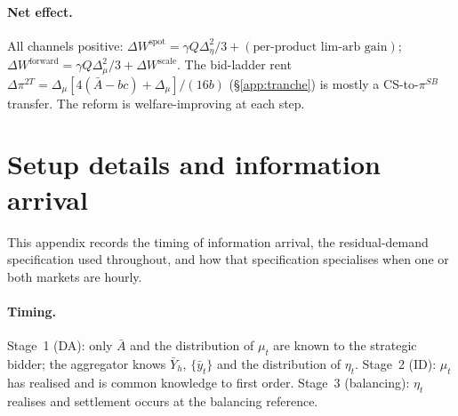 \documentclass[11pt]{article}
\begin{document}
\paragraph{Net effect.} All channels positive: $\Delta W^{\text{spot}} = \gamma Q \Delta_\eta^2/3 + (\text{per-product lim-arb gain})$; $\Delta W^{\text{forward}} = \gamma Q \Delta_\mu^2/3 + \Delta W^{\text{scale}}$. The bid-ladder rent $\Delta\pi^{2T} = \Delta_\mu[4(\bar A - bc) + \Delta_\mu]/(16 b)$ (\S\ref{app:tranche}) is mostly a CS-to-$\pi^{SB}$ transfer. The reform is welfare-improving at each step.

{\footnotesize


}

\newpage


\appendix
\section{Setup details and information arrival}\label{app:setup}

This appendix records the timing of information arrival, the \citeauthor{ito_reguant_2016} residual-demand specification used throughout, and how that specification specialises when one or both markets are hourly.

\paragraph{Timing.} Stage~1 (DA): only $\bar A$ and the distribution of $\mu_t$ are known to the strategic bidder; the aggregator knows $\bar Y_h$, $\{\bar y_t\}$ and the distribution of $\eta_t$. Stage~2 (ID): $\mu_t$ has realised and is common knowledge to first order. Stage~3 (balancing): $\eta_t$ realises and settlement occurs at the balancing reference.
\end{document}
